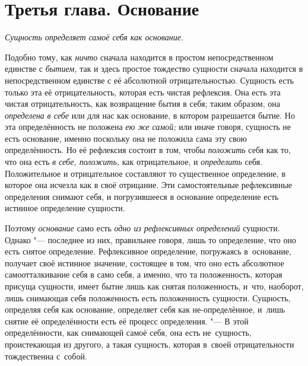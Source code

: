 \chapter[{\em Третья глава} Основание]{Третья глава. Основание}

{\em Сущность определяет самоё себя как основание}.

Подобно тому, как {\em ничто} сначала находится в простом непосредственном
единстве с {\em бытием,} так и здесь простое тождество сущности сначала
находится в непосредственном единстве с её абсолютной отрицательностью.
Сущность есть только эта её отрицательность, которая есть чистая рефлексия. Она
есть эта чистая отрицательность, как возвращение бытия в себя; таким образом,
она {\em определена в себе} или для нас как основание, в котором разрешается
бытие. Но эта определённость не положена {\em ею же самой;} или иначе говоря,
сущность не есть основание, именно поскольку она не положила сама эту свою
определённость. Но её рефлексия состоит в том, чтобы {\em положить} себя как
то, что она есть {\em в себе, положить,} как отрицательное, и {\em определить}
себя. Положительное и отрицательное составляют то существенное определение,
в которое она исчезла как в своё отрицание. Эти самостоятельные рефлексивные
определения снимают себя, и погрузившееся в основание определение есть истинное
определение сущности.

Поэтому {\em основание} само есть {\em одно из рефлексивных определений}
сущности. Однако "--- последнее из них, правильнее говоря, лишь то определение,
что оно есть снятое определение. Рефлексивное определение, погружаясь
в~основание, получает своё истинное значение, состоящее в том, что оно есть
абсолютное самоотталкивание себя в само себя, а именно, что та положенность,
которая присуща сущности, имеет бытие лишь как снятая положенность, и~что,
наоборот, лишь снимающая себя положенность есть положенность сущности.
Сущность, определяя себя как основание, определяет себя как не-определённое,
и~лишь снятие её определённости есть её процесс определения. "--- В этой
определённости, как снимающей самоё себя, она есть не~сущность, проистекающая
из другого, а такая сущность, которая в~своей отрицательности тождественна
с~собой.

